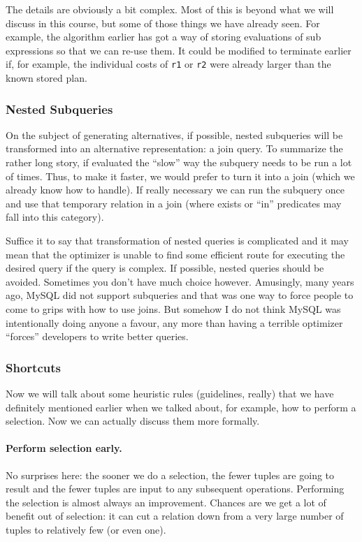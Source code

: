 The details are obviously a bit complex. Most of this is beyond what we will discuss in this course, but some of those things we have already seen. For example, the algorithm earlier has got a way of storing evaluations of sub expressions so that we can re-use them. It could be modified to terminate earlier if, for example, the individual costs of \texttt{r1} or \texttt{r2} were already larger than the known stored plan.

\subsubsection*{Nested Subqueries}

On the subject of generating alternatives, if possible, nested subqueries will be transformed into an alternative representation: a join query. To summarize the rather long story, if evaluated the ``slow'' way the subquery needs to be run a lot of times. Thus, to make it faster, we would prefer to turn it into a join (which we already know how to handle). If really necessary we can run the subquery once and use that temporary relation in a join (where exists or ``in'' predicates may fall into this category).

Suffice it to say that transformation of nested queries is complicated and it may mean that the optimizer is unable to find some efficient route for executing the desired query if the query is complex. If possible, nested queries should be avoided. Sometimes you don't have much choice however. Amusingly, many years ago, MySQL did not support subqueries and that was one way to force people to come to grips with how to use joins. But somehow I do not think MySQL was intentionally doing anyone a favour, any more than having a terrible optimizer ``forces'' developers to write better queries. 


\subsubsection*{Shortcuts}

Now we will talk about some heuristic rules (guidelines, really) that we have definitely mentioned earlier when we talked about, for example, how to perform a selection. Now we can actually discuss them more formally.

\paragraph{Perform selection early.} No surprises here: the sooner we do a selection, the fewer tuples are going to result and the fewer tuples are input to any subsequent operations. Performing the selection is almost always an improvement. Chances are we get a lot of benefit out of selection: it can cut a relation down from a very large number of tuples to relatively few (or even one). 

